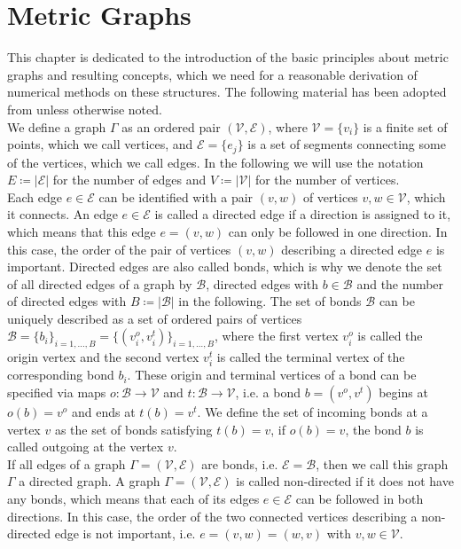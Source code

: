\section{Metric Graphs}
\label{ch1:sec1}

This chapter is dedicated to the introduction of the basic principles about metric graphs and resulting concepts, which we need for a reasonable derivation of numerical methods on these structures. The following material has been adopted from \cite[chapter~1]{BerkolaikoKuchment:2013} unless otherwise noted. \\

We define a graph $\Gamma$ as an ordered pair $(\mathcal{V}, \mathcal{E})$, where $\mathcal{V} = \{v_i\}$ is a finite set of points, which we call vertices, and $\mathcal{E} = \{e_j\}$ is a set of segments connecting some of the vertices, which we call edges. In the following we will use the notation $E \coloneqq \left\lvert \mathcal{E} \right\rvert$ for the number of edges and $V \coloneqq \left\lvert \mathcal{V} \right\rvert$ for the number of vertices. \\
Each edge $e \in \mathcal{E}$ can be identified with a pair $(v, w)$ of vertices $v, w \in \mathcal{V}$, which it connects. An edge $e \in \mathcal{E}$ is called a directed edge if a direction is assigned to it, which means that this edge $e = (v, w)$ can only be followed in one direction. In this case, the order of the pair of vertices $(v, w)$ describing a directed edge $e$ is important. Directed edges are also called bonds, which is why we denote the set of all directed edges of a graph by $\mathcal{B}$, directed edges with $b \in \mathcal{B}$ and the number of directed edges with $B \coloneqq \left\lvert \mathcal{B} \right\rvert$ in the following. The set of bonds $\mathcal{B}$ can be uniquely described as a set of ordered pairs of vertices $\mathcal{B} = \{b_i\}_{i = 1, \ldots, B} = \{(v^{o}_{i}, v^{t}_{i})\}_{i = 1, \ldots, B}$, where the first vertex $v^{o}_{i}$ is called the origin vertex and the second vertex $v^{t}_{i}$ is called the terminal vertex of the corresponding bond $b_i$. These origin and terminal vertices of a bond can be specified via maps $o \colon \mathcal{B} \to \mathcal{V}$ and $t \colon \mathcal{B} \to \mathcal{V}$, i.e. a bond $b = (v^{o}, v^{t})$ begins at $o(b) = v^{o}$ and ends at $t(b) = v^{t}$. We define the set of incoming bonds at a vertex $v$ as the set of bonds satisfying $t(b) = v$, if $o(b) = v$, the bond $b$ is called outgoing at the vertex $v$. \\
If all edges of a graph $\Gamma = (\mathcal{V}, \mathcal{E})$ are bonds, i.e. $\mathcal{E} = \mathcal{B}$, then we call this graph $\Gamma$ a directed graph. A graph $\Gamma = (\mathcal{V}, \mathcal{E})$ is called non-directed if it does not have any bonds, which means that each of its edges $e \in \mathcal{E}$ can be followed in both directions. In this case, the order of the two connected vertices describing a non-directed edge is not important, i.e. $e = (v, w) = (w, v)$ with $v, w \in \mathcal{V}$. \\
